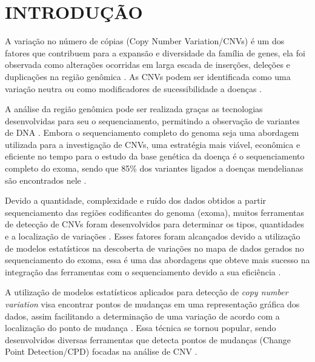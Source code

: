 
\chapter{INTRODUÇÃO}
\label{chap:introducao}

A variação no número de cópias (Copy Number Variation/CNVs) é um dos fatores que contribuem para a expansão e diversidade da família de genes, ela foi observada como alterações ocorridas em larga escada de inserções, deleções e duplicações na região genômica \cite{Perry2009,Zhao2013,Redon2006,Costain2016}. 
As CNVs podem ser identificada como uma variação neutra ou como modificadores de sucessibilidade a doenças \cite{Costain2016,Perry2009}.

A análise da região genômica pode ser realizada graças as tecnologias desenvolvidas para seu o sequenciamento, permitindo a observação de variantes de DNA \cite{Sathirapongsasuti2011}. Embora o sequenciamento completo do genoma seja uma abordagem utilizada para a investigação de CNVs, uma estratégia mais viável, econômica e eficiente no tempo para o estudo da base genética da doença é o sequenciamento completo do exoma, sendo que 85\% dos variantes ligados a doenças mendelianas são encontrados nele \cite{Chong2015,Sathirapongsasuti2011,Fromer2012}.

Devido a quantidade, complexidade e ruído dos dados obtidos a partir sequenciamento das regiões codificantes do genoma (exoma), muitos ferramentas de detecção de CNVs foram desenvolvidos para determinar os tipos, quantidades e a localização de variações \cite{Fromer2012,Tan2014}. Esses fatores foram alcançados devido a utilização de modelos estatísticos na descoberta de variações no mapa de dados gerados no sequenciamento do exoma, essa é uma das abordagens que obteve mais sucesso na integração das ferramentas com o sequenciamento devido a sua eficiência \cite{Tan2014}.

A utilização de modelos estatísticos aplicados para detecção de \textit{copy number variation} visa encontrar pontos de mudanças em uma representação gráfica dos dados, assim facilitando a determinação de uma variação de acordo com a localização do ponto de mudança \cite{Zhao2013}. Essa técnica se tornou popular, sendo desenvolvidos diversas ferramentas que detecta pontos de mudanças (Change Point Detection/CPD) focadas na análise de CNV \cite{Olshen2004,Baldi2001,Girimurugan2018,Picard2011,Plagnol2012,Muggeo2010}. 


